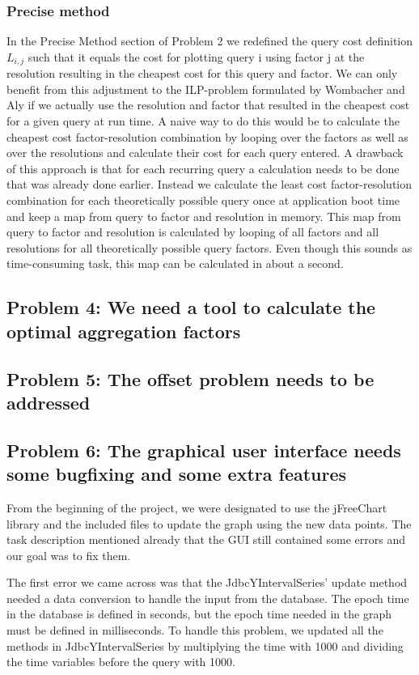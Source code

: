 \subsubsection{Precise method}
In the Precise Method section of Problem 2 we redefined the query cost definition $L_{i,j}$ such that it equals the cost for plotting query i using factor j at the resolution resulting in the cheapest cost for this query and factor. We can only benefit from this adjustment to the ILP-problem formulated by Wombacher and Aly \cite{wombacher2011} if we actually use the resolution and factor that resulted in the cheapest cost for a given query at run time. A naive way to do this would be to calculate the cheapest cost factor-resolution combination by looping over the factors as well as over the resolutions and calculate their cost for each query entered. A drawback of this approach is that for each recurring query a calculation needs to be done that was already done earlier. Instead we calculate the least cost factor-resolution combination for each theoretically possible query once at application boot time and keep a map from query to factor and resolution in memory. This map from query to factor and resolution is calculated by looping of all factors and all resolutions for all theoretically possible query factors. Even though this sounds as time-consuming task, this map can be calculated in about a second.

\subsection{Problem 4: We need a tool to calculate the optimal aggregation factors}
\subsection{Problem 5: The offset problem needs to be addressed}
\subsection{Problem 6: The graphical user interface needs some bugfixing and some extra features}
From the beginning of the project, we were designated to use the jFreeChart library and the included files to update the graph using the new data points. The task description mentioned already that the GUI still contained some errors and our goal was to fix them.

The first error we came across was that the JdbcYIntervalSeries' update method needed a data conversion to handle the input from the database. The epoch time in the database is defined in seconds, but the epoch time needed in the graph must be defined in milliseconds. To handle this problem, we updated all the methods in JdbcYIntervalSeries by multiplying the time with 1000 and dividing the time variables before the query with 1000.

